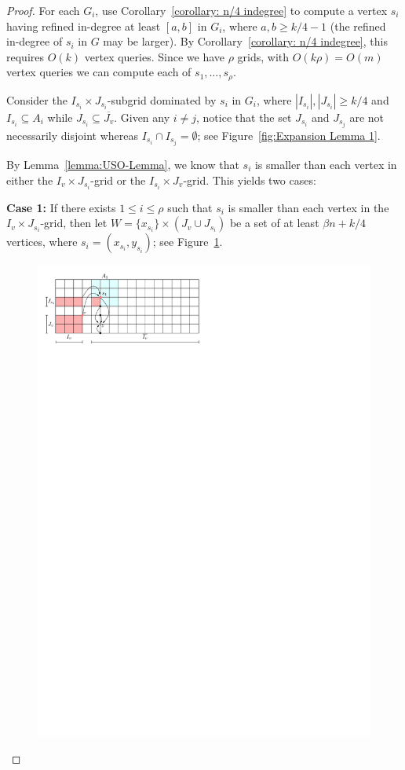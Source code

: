 \documentclass[a4paper,10pt]{article}
\newcommand{\indegree}{refined in-degree\xspace}
\begin{document}
\begin{proof}
For each $G_i$, use Corollary~\ref{corollary: n/4 indegree} to compute a vertex $s_i$ having \indegree at least $[a,b]$ in $G_i$, where $a,b \geq k/4 - 1$ (the \indegree of $s_i$ in $G$ may be larger).
By Corollary~\ref{corollary: n/4 indegree}, this requires $O(k)$ vertex queries. Since we have $\rho$ grids, with $O(k\rho) = O(m)$ vertex queries we can compute each of $s_1, \ldots, s_\rho$.
 

Consider the $I_{s_i}\times J_{s_i}$-subgrid dominated by $s_i$ in $G_i$, where $|I_{s_i}|, |J_{s_i}| \geq k/4$ and $I_{s_i}\subseteq A_i$ while $J_{s_i}\subseteq \overline{J_v}$. 
Given any $i\neq j$, notice that the set $J_{s_i}$ and $J_{s_j}$ are not necessarily disjoint whereas $I_{s_i}\cap I_{s_j} = \emptyset$; see Figure~\ref{fig:Expansion Lemma 1}.

By Lemma~\ref{lemma:USO-Lemma}, we know that $s_i$ is smaller than each vertex in either the $I_v\times J_{s_i}$-grid or the $I_{s_i}\times J_v$-grid. This yields two cases:

\textbf{Case 1:} If there exists $1\leq i \leq \rho$ such that
$s_i$ is smaller than each vertex in the $I_v\times J_{s_i}$-grid, then let $W =  \{x_{s_i}\} \times (J_v\cup J_{s_i})$ be a set of at least $\beta n + k/4$ vertices, where $s_i = (x_{s_i}, y_{s_i})$; see Figure~\ref{fig:Expansion Case 1}. 

\begin{figure}[h]
\centering
\includegraphics{expansion_lemma_Case1.pdf}
\caption{\small }
\label{fig:Expansion Case 1}
\end{figure}


\end{proof}
\end{document}
